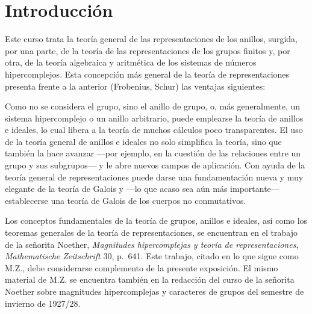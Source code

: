 \clearpage
{}
\medskip
{}
\endgroup
\clearpage

\section*{Introducción}

Este curso trata la teoría general de las representaciones de los anillos, surgida, por una parte, de la teoría de las representaciones de los grupos finitos y, por otra, de la teoría algebraica y aritmética de los sistemas de números hipercomplejos. Esta concepción más general de la teoría de representaciones presenta frente a la anterior (Frobenius, Schur) las ventajas siguientes:

Como no se considera el grupo, sino el anillo de grupo, o, más generalmente, un sistema hipercomplejo o un anillo arbitrario, puede emplearse la teoría de anillos e ideales, lo cual libera a la teoría de muchos cálculos poco transparentes. El uso de la teoría general de anillos e ideales no solo simplifica la teoría, sino que también la hace avanzar ---por ejemplo, en la cuestión de las relaciones entre un grupo y sus subgrupos--- y le abre nuevos campos de aplicación. Con ayuda de la teoría general de representaciones puede darse una fundamentación nueva y muy elegante de la teoría de Galois y ---lo que acaso sea aún más importante--- establecerse una teoría de Galois de los cuerpos no conmutativos.

Los conceptos fundamentales de la teoría de grupos, anillos e ideales, así como los teoremas generales de la teoría de representaciones, se encuentran en el trabajo de la señorita Noether, \emph{Magnitudes hipercomplejas y teoría de representaciones}, \emph{Mathematische Zeitschrift} 30, p.~641. Este trabajo, citado en lo que sigue como M.Z., debe considerarse complemento de la presente exposición. El mismo material de M.Z. se encuentra también en la redacción del curso de la señorita Noether sobre magnitudes hipercomplejas y caracteres de grupos del semestre de invierno de 1927/28.

